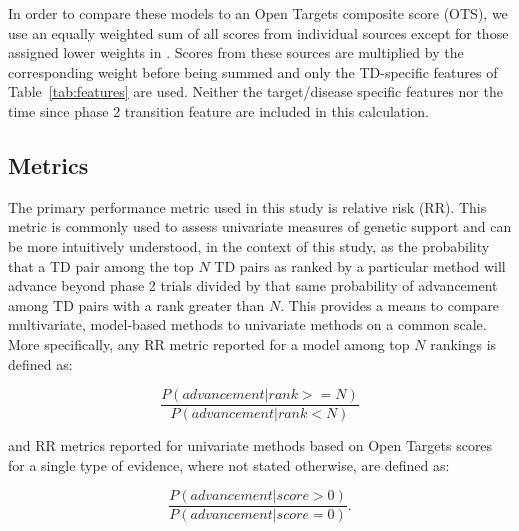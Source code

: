 \documentclass{article}
\begin{document}
In order to compare these models to an Open Targets composite score (OTS), we use an equally weighted sum of all scores from individual sources except for those assigned lower weights in \cite{OTweights}. Scores from these sources are multiplied by the corresponding weight before being summed and only the TD-specific features of Table~\ref{tab:features} are used. Neither the target/disease specific features nor the time since phase 2 transition feature are included in this calculation.

\subsection{Metrics}
\label{sec:metrics}

The primary performance metric used in this study is relative risk (RR). This metric is commonly used to assess univariate measures of genetic support \cite{Nelson2015-eg,King2019-rc,Minikel2023.06.23.23291765} and can be more intuitively understood, in the context of this study, as the probability that a TD pair among the top $N$ TD pairs as ranked by a particular method will advance beyond phase 2 trials divided by that same probability of advancement among TD pairs with a rank greater than $N$. This provides a means to compare multivariate, model-based methods to univariate methods on a common scale. More specifically, any RR metric reported for a model among top $N$ rankings is defined as:

\begin{equation}
  \frac{P(advancement | rank >= N)}{P(advancement | rank < N)}
\end{equation}

and RR metrics reported for univariate methods based on Open Targets scores for a single type of evidence, where not stated otherwise, are defined as:

\begin{equation}
  \frac{P(advancement | score > 0)}{P(advancement | score = 0)}.
\end{equation}
\end{document}
